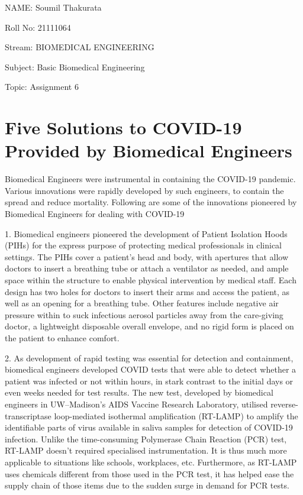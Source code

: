 \documentclass[11pt]{article}
\begin{document}
NAME: Soumil Thakurata

Roll No: 21111064

Stream: BIOMEDICAL ENGINEERING

Subject: Basic Biomedical Engineering

Topic: Assignment 6

\pagebreak


\section*{\centering Five Solutions to COVID-19 Provided by Biomedical Engineers}

Biomedical Engineers were instrumental in containing the COVID-19 pandemic. Various innovations were rapidly developed by such engineers, to contain the spread and reduce mortality. Following are some of the innovations pioneered by Biomedical Engineers for dealing with COVID-19

1. Biomedical engineers pioneered the development of Patient Isolation Hoods (PIHs) for the express purpose of protecting medical professionals in clinical settings. The PIHs cover a patient’s head and body, with apertures that allow doctors to insert a breathing tube or attach a ventilator as needed, and ample space within the structure to enable physical intervention by medical staff. Each design has two holes for doctors to insert their arms and access the patient, as well as an opening for a breathing tube. Other features include negative air pressure within to suck infectious aerosol particles away from the care-giving doctor, a lightweight disposable overall envelope, and no rigid form is placed on the patient to enhance comfort.

2. As development of rapid testing was essential for detection and containment, biomedical engineers developed COVID tests that were able to detect whether a patient was infected or not within hours, in stark contrast to the initial days or even weeks needed for test results. The new test, developed by biomedical engineers in UW–Madison’s AIDS Vaccine Research Laboratory, utilised reverse-transcriptase loop-mediated isothermal amplification (RT-LAMP) to amplify the identifiable parts of virus available in saliva samples for detection of COVID-19 infection. Unlike the time-consuming Polymerase Chain Reaction (PCR) test, RT-LAMP doesn't required specialised instrumentation. It is thus much more applicable to situations like schools, workplaces, etc. Furthermore, as RT-LAMP uses chemicals different from those used in the PCR test, it has helped ease the supply chain of those items due to the sudden surge in demand for PCR tests.
\end{document}
